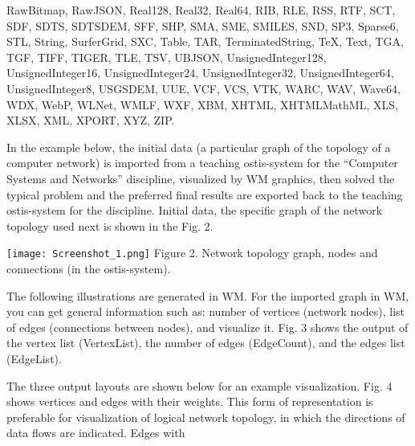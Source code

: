 \documentclass{article}
\begin{document}
\begin{multicols}{2}
\noindent RawBitmap, RawJSON, Real128, Real32, Real64, RIB,
RLE, RSS, RTF, SCT, SDF, SDTS, SDTSDEM, SFF,
SHP, SMA, SME, SMILES, SND, SP3, Sparse6, STL,
String, SurferGrid, SXC, Table, TAR, TerminatedString,
TeX, Text, TGA, TGF, TIFF, TIGER, TLE, TSV,
UBJSON, UnsignedInteger128, UnsignedInteger16, UnsignedInteger24, UnsignedInteger32, UnsignedInteger64,
UnsignedInteger8, USGSDEM, UUE, VCF, VCS, VTK,
WARC, WAV, Wave64, WDX, WebP, WLNet, WMLF,
WXF, XBM, XHTML, XHTMLMathML, XLS, XLSX,
XML, XPORT, XYZ, ZIP.

In the example below, the initial data (a particular
graph of the topology of a computer network) is imported
from a teaching ostis-system for the “Computer Systems
and Networks” discipline, visualized by WM graphics,
then solved the typical problem and the preferred final
results are exported back to the teaching ostis-system
for the discipline. Initial data, the specific graph of the
network topology used next is shown in the Fig. 2.

\texttt{[image: Screenshot\_1.png]}
{\fontsize{8pt}{12pt}\selectfont Figure 2. Network topology graph, nodes and connections (in the
ostis-system).}

The following illustrations are generated in WM.
For the imported graph in WM, you can get general
information such as: number of vertices (network nodes),
list of edges (connections between nodes), and visualize
it. Fig. 3 shows the output of the vertex list (VertexList),
the number of edges (EdgeCount), and the edges list
(EdgeList).

The three output layouts are shown below for an example visualization. Fig. 4 shows vertices and edges with
their weights. This form of representation is preferable
for visualization of logical network topology, in which
the directions of data flows are indicated. Edges with
\end{multicols}
\end{document}
